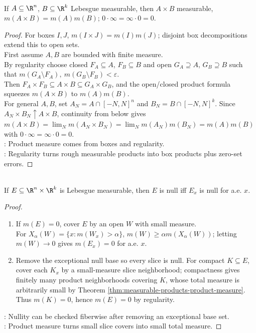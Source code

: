 \begin{theorem} \label{thm:measurable-products-product-measure} \\
If $A\subseteq\R^n$, $B\subseteq\R^k$ Lebesgue measurable, then $A\times B$ measurable, $m(A\times B)=m(A)m(B)$; $0\cdot\infty=\infty\cdot0=0$.
\begin{proof}
For boxes $I,J$, $m(I\times J)=m(I)m(J)$; disjoint box decompositions extend this to open sets.\\
First assume $A,B$ are bounded with finite measure.\\
By regularity choose closed $F_A\subseteq A$, $F_B\subseteq B$ and open $G_A\supseteq A$, $G_B\supseteq B$ such that $m(G_A\setminus F_A),\ m(G_B\setminus F_B)<\varepsilon$.\\
Then $F_A\times F_B\subseteq A\times B\subseteq G_A\times G_B$, and the open/closed product formula squeezes $m(A\times B)$ to $m(A)m(B)$.\\
For general $A,B$, set $A_N=A\cap[-N,N]^n$ and $B_N=B\cap[-N,N]^k$. Since $A_N\times B_N\uparrow A\times B$, continuity from below gives $m(A\times B)=\lim_N m(A_N\times B_N)=\lim_N m(A_N)m(B_N)=m(A)m(B)$ with $0\cdot\infty=\infty\cdot0=0$.\\
: Product measure comes from boxes and regularity.\\
: Regularity turns rough measurable products into box products plus zero-set errors.
\end{proof}
\end{theorem}

\begin{theorem} \label{thm:zero-slices-null-set-criterion} \\
If $E\subseteq\R^n\times\R^k$ is Lebesgue measurable, then $E$ is null iff $E_x$ is null for a.e. $x$.
\begin{proof}
\begin{enumerate}[label=\roman*.]
\setlength{\itemsep}{0pt}
\item[$(\Rightarrow)$] If $m(E)=0$, cover $E$ by an open $W$ with small measure.\\
For $X_\alpha(W)=\{x:m(W_x)>\alpha\}$, $m(W)\geq \alpha m(X_\alpha(W))$; letting $m(W)\to0$ gives $m(E_x)=0$ for a.e. $x$.
\item[$(\Leftarrow)$] Remove the exceptional null base so every slice is null. For compact $K\subseteq E$, cover each $K_x$ by a small-measure slice neighborhood; compactness gives finitely many product neighborhoods covering $K$, whose total measure is arbitrarily small by Theorem \ref{thm:measurable-products-product-measure}. Thus $m(K)=0$, hence $m(E)=0$ by regularity.
\end{enumerate}
: Nullity can be checked fiberwise after removing an exceptional base set.\\
: Product measure turns small slice covers into small total measure.
\end{proof}
\end{theorem}

